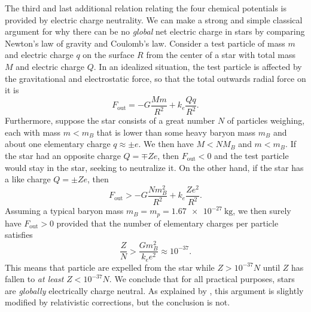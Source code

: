 The third and last additional relation relating the four chemical potentials is provided by electric charge neutrality.
We can make a strong and simple classical argument for why there can be no \emph{global} net electric charge in stars by comparing Newton's law of gravity and Coulomb's law.
Consider a test particle of mass $m$ and electric charge $q$ on the surface $R$ from the center of a star with total mass $M$ and electric charge $Q$.
In an idealized situation, the test particle is affected by the gravitational and electrostatic force, so that the total outwards radial force on it is
\begin{equation}
	F_\text{out} = -G \frac{M m}{R^2} + k_e \frac{Q q}{R^2} .
\end{equation}
Furthermore, suppose the star consists of a great number $N$ of particles weighing, each with mass $m < m_B$ that is lower than some heavy baryon mass $m_B$ and about one elementary charge $q \approx \pm e$.
We then have $M < N M_B$ and $m < m_B$.
If the star had an opposite charge $Q = \mp Z e$, then $F_\text{out} < 0$ and the test particle would stay in the star, seeking to neutralize it.
On the other hand, if the star has a like charge $Q = \pm Z e$, then
\begin{equation}
	F_\text{out} > -G \frac{N m_B^2}{R^2} + k_e \frac{Z e^2}{R^2} .
\end{equation}
Assuming a typical baryon mass $m_B = m_p = \SI{1.67e-27}{\kilogram}$,
we then surely have $F_\text{out} > 0$ provided that the number of elementary charges per particle satisfies
\begin{equation}
	\frac{Z}{N} > \frac{G m_B^2}{k_e e^2} \approx 10^{-37} .
\end{equation}
This means that particle are expelled from the star while $Z > 10^{-37} N$ until $Z$ has fallen to \emph{at least} $Z < 10^{-37} N$.
We conclude that for all practical purposes, stars are \emph{globally} electrically charge neutral.
As explained by \cite{ref:master_halvor}, this argument is slightly modified by relativistic corrections, but the conclusion is not.

